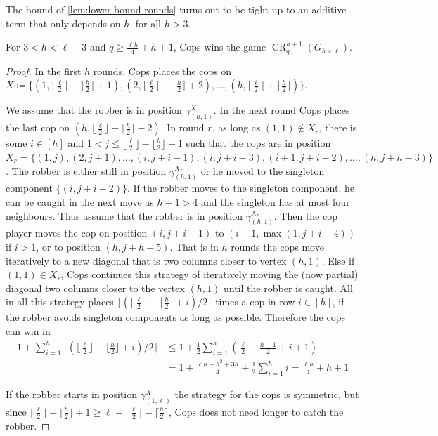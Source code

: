 \documentclass[a4paper,UKenglish,cleveref, autoref, thm-restate]{lipics-v2021}
\DeclareMathOperator{\CR}{CR}
\newcommand{\grid}[2]{\ensuremath{G_{#1 \times #2}}}
\begin{document}
The bound of \cref{lem:lower-bound-rounds} turns out to be tight up to an additive term that only depends on $h$, for all $h>3$.

\begin{lemma}
	\label{lem:upper-bound-rounds}
	For $3<h<\ell-3$ and $q\geq \frac{\ell h}{4} + h +1$, Cops wins the game $\CR_q^{h+1}(\grid{h}{\ell})$.
\end{lemma}

\begin{proof}
	In the first $h$ rounds, Cops places the cops on $X\coloneqq\{(1,\lfloor\frac{\ell}{2}\rfloor-\lfloor\frac{h}{2}\rfloor+1),(2,\lfloor\frac{\ell}{2}\rfloor-\lfloor\frac{h}{2}\rfloor+2),\ldots,(h,\lfloor\frac{\ell}{2}\rfloor+\lceil\frac{h}{2}\rceil)\}$.
	
	We assume that the robber is in position $\gamma_{(h,1)}^X$.
	In the next round Cops places the last cop on $(h,\lfloor\frac{\ell}{2}\rfloor+\lceil\frac{h}{2}\rceil - 2)$.
	In round $r$, as long as $(1,1)\notin X_r$, there is some $i\in[h]$ and $1<j\leq \lfloor\frac{\ell}{2}\rfloor-\lfloor\frac{h}{2}\rfloor+1$ such that the cops are in position $X_{r}=\{(1,j), (2,j+1), \ldots, (i,j+i-1), (i,j+i-3), (i+1,j+i-2), \ldots, (h,j+h-3)\}$.
	The robber is either still in position $\gamma_{(h,1)}^{X_{r}}$ or he moved to the singleton component $\{(i,j+i-2)\}$.
	If the robber moves to the singleton component, he can be caught in the next move as $h+1>4$ and the singleton has at most four neighbours.
	Thus assume that the robber is in position $\gamma_{(h,1)}^{X_{r}}$.
	Then the cop player moves the cop on position $(i,j+i-1)$ to $(i-1,\max(1,j+i-4))$ if $i>1$, or to position $(h,j+h-5)$.
	That is in $h$ rounds the cops move iteratively to a new diagonal that is two columns closer to vertex $(h,1)$.
	Else if $(1,1)\in X_r$, Cops continues this strategy of iteratively moving the (now partial) diagonal two columns closer to the vertex $(h,1)$ until the robber is caught.
	All in all this strategy places $\lceil(\lfloor\frac{\ell}{2}\rfloor-\lfloor\frac{h}{2}\rfloor+i)/2\rceil$ times a cop in row $i\in [h]$, if the robber avoids singleton components as long as possible.
	Therefore the cops can win in
	\begin{align*}
	1 + \sum_{i=1}^{h} \lceil(\lfloor\frac{\ell}{2}\rfloor-\lfloor\frac{h}{2}\rfloor+i)/2\rceil &\leq 1 + \frac12 \sum_{i=1}^{h} (\frac{\ell}{2}-\frac{h-1}{2}+i+1)\\
		&= 1 + \frac{\ell h-h^2+3h}{4} +\frac12\sum_{i=1}^{h} i = \frac{\ell h}{4} + h + 1
	\end{align*}
	
	If the robber starts in position $\gamma_{(1,\ell)}^X$ the strategy for the cops is symmetric, but since $\lfloor\frac{\ell}{2}\rfloor-\lfloor\frac{h}{2}\rfloor+1\geq \ell - \lfloor\frac{\ell}{2}\rfloor - \lceil\frac{h}{2}\rceil$, Cops does not need longer to catch the robber.
\end{proof}
\end{document}
